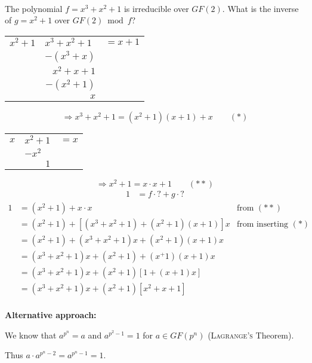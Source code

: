 \begin{example} \ \\
The polynomial $f = x^3 + x^2 +1$ is irreducible over $GF(2)$. What is the inverse of $g = x^2 +1$ over $GF(2) \bmod f$? \\

\bgroup
\def\arraystretch{1.5}
\begin{tabular}{clc}
\cline{2-2}
 \multicolumn{1}{r|}{$x^2 +1$} & $x^3+x^2 +1$ & $ = x+1$ \\
 & \multicolumn{1}{r}{$-(x^3 + x)$} & \\
 \cline{2-2}
 & \multicolumn{1}{r}{$x^2+x+1$} & \\
 & \multicolumn{1}{r}{$-(x^2+1)$} & \\
 \cline{2-2}
 & \multicolumn{1}{r}{$x$}
\end{tabular}
\egroup \hfill

\[ \Rightarrow x^3 + x^2 +1= (x^2+1)(x+1)+x \qquad (\ast)\]

\bgroup
\def\arraystretch{1.5}
\begin{tabular}{clc}
\cline{2-2}
 \multicolumn{1}{r|}{$x$} & $x^2+1$ & $ = x$ \\
 & $-x^2$ & \\
 \cline{2-2}
 & \multicolumn{1}{r}{$1$} & \\
\end{tabular}
\egroup \hfill

\[ \Rightarrow x^2 +1=x \cdot x +1 \qquad (\ast \ast)\]
\begin{align*}
1 &= f \cdot ? + g \cdot ?
\end{align*}
\begin{align*}
1 &= (x^2+1) + x \cdot x  &\text{from } (\ast \ast)\\
&= (x^2 +1) + [(x^3+x^2+1)+(x^2+1)(x+1)]x & \text{from inserting } (\ast) \\
&= (x^2+1) + (x^3+x^2+1)x+(x^2+1)(x+1)x \\
&= (x^3+x^2+1)x+(x^2+1)+(x^+1)(x+1)x \\
&= (x^3+x^2+1)x+(x^2+1)[1+(x+1)x] \\
&= (x^3+x^2+1)x+(x^2+1)[x^2+x+1] \\
\end{align*}
\end{example}

\textbf{Alternative approach:}

We know that $a^{p^n} =a$ and $a^{p^2-1}=1$ for $a \in GF(p^n)$ (\textsc{Lagrange's} Theorem).

Thus $a \cdot a^{p^n-2} = a^{p^n-1} =1$.


